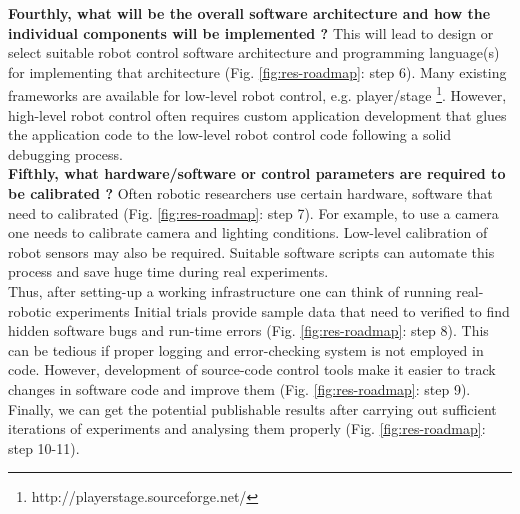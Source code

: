 \textbf{Fourthly, what will be the overall software architecture and how the individual components will be implemented ?} This will lead to design or select suitable robot control software architecture and programming language(s) for implementing that architecture (Fig. \ref{fig:res-roadmap}: step 6). Many existing frameworks are available for low-level robot control, e.g. player/stage \footnote{http://playerstage.sourceforge.net/}. However, high-level robot control often requires custom application development that glues the application code to the low-level robot control code following a solid debugging process.\\
\textbf{Fifthly, what hardware/software or control parameters are required to be calibrated ?}  Often robotic researchers use 
certain hardware, software that need to calibrated (Fig. \ref{fig:res-roadmap}: step 7). For example, to use a camera one needs to calibrate camera and lighting conditions. Low-level calibration of robot sensors may also be required. Suitable software scripts  can automate this process and save huge time during real experiments.\\
Thus, after setting-up  a working infrastructure one can think of running real-robotic experiments  Initial trials provide sample data that need to verified to find hidden software bugs and run-time errors (Fig. \ref{fig:res-roadmap}: step 8). This can be tedious if proper logging and error-checking system is not employed in code. However, development of source-code control tools make it easier to track changes in software code and improve them (Fig. \ref{fig:res-roadmap}: step 9). Finally, we can get the potential publishable  results after carrying out sufficient iterations of experiments and analysing them properly (Fig. \ref{fig:res-roadmap}: step 10-11).
